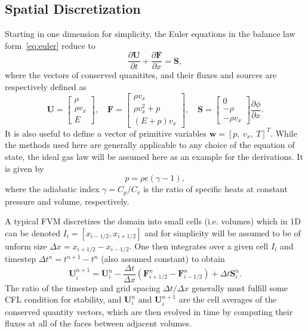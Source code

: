 \subsection{Spatial Discretization}
\label{subsec:space}

Starting in one dimension for simplicity, the Euler equations in the balance law form~\eqref{eq:euler} reduce to
\begin{equation} \label{eq:euler1D}
\frac{\partial \mathbf{U}}{\partial t}+\frac{\partial \mathbf{F}}{\partial x}=\mathbf{S},
\end{equation}
where the vectors of conserved quanitites, and their fluxes and sources are respectively defined as
\begin{equation}
\mathbf{U}=
\begin{bmatrix}
\rho \\ \rho v_x \\ E
\end{bmatrix}
,\quad \mathbf{F}=
\begin{bmatrix}
\rho v_x \\ \rho v_x^2+p \\ (E+p)v_x
\end{bmatrix}
,\quad \mathbf{S}=
\begin{bmatrix}
0 \\ -\rho \\ -\rho v_x
\end{bmatrix} \frac{\partial \phi}{\partial x}.
\end{equation}
It is also useful to define a vector of primitive variables $\mathbf{w}=[p,\ v_x,\ T]^T$. While the methods used here are generally applicable to any choice of the equation of state, the ideal gas law will be assumed here as an example for the derivations. It is given by
\begin{equation}
p=\rho e(\gamma-1),
\end{equation}
where the adiabatic index $\gamma=C_p/C_v$ is the ratio of specific heats at constant pressure and volume, respectively.

A typical FVM discretizes the domain into small cells (i.e. volumes) which in 1D can be denoted $I_i=[x_{i-1/2},x_{i+1/2}]$ and for simplicity will be assumed to be of unform size $\Delta x=x_{i+1/2}-x_{i-1/2}$. One then integrates over a given cell $I_i$ and timestep $\Delta t^n=t^{n+1}-t^n$ (also assumed constant) to obtain
\begin{equation}
\mathbf{U}_i^{n+1}=\mathbf{U}_i^n-\frac{\Delta t}{\Delta x}\left(\mathbf{F}_{i+1/2}^n-\mathbf{F}_{i-1/2}^n\right)+\Delta t\mathbf{S}_i^n.
\end{equation}
The ratio of the timestep and grid spacing $\Delta t/\Delta x$ generally must fulfill some CFL condition for stability, and $\mathbf{U}_i^n$ and $\mathbf{U}_i^{n+1}$ are the cell averages of the conserved quantity vectors, which are then evolved in time by computing their fluxes at all of the faces between adjacent volumes.

